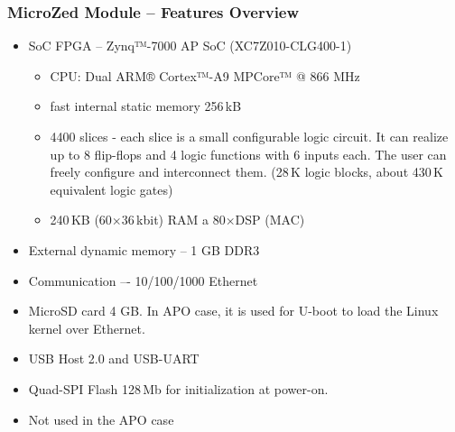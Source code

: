 \documentclass{beamer}
\begin{document}
\begin{frame}
\frametitle{MicroZed Module -- Features Overview}

\begin{itemize}
 \item SoC FPGA – Zynq™-7000 AP SoC (XC7Z010-CLG400-1)
 \begin{itemize}
  \item CPU: Dual ARM® Cortex™-A9 MPCore™ @ 866 MHz
  \item fast internal static memory 256\,kB
  \item 4400 slices - each slice is a small configurable logic circuit.
     It can realize up to 8 flip-flops and 4 logic functions with 6 inputs each.
     The user can freely configure and interconnect them. (28\,K logic blocks, about 430\,K equivalent logic gates)
  \item 240\,KB (60$\times$36\,kbit) RAM a 80$\times$DSP (MAC)

 \end{itemize}
  \item External dynamic memory – 1 GB DDR3
  \item Communication –- 10/100/1000 Ethernet
  \item MicroSD card 4 GB. In APO case, it is used for U-boot to load the Linux kernel over Ethernet.
  \item USB Host 2.0 and USB-UART
  \item Quad-SPI Flash 128\,Mb for initialization at power-on.
  \item Not used in the APO case
\end{itemize}
\end{frame}
\end{document}
